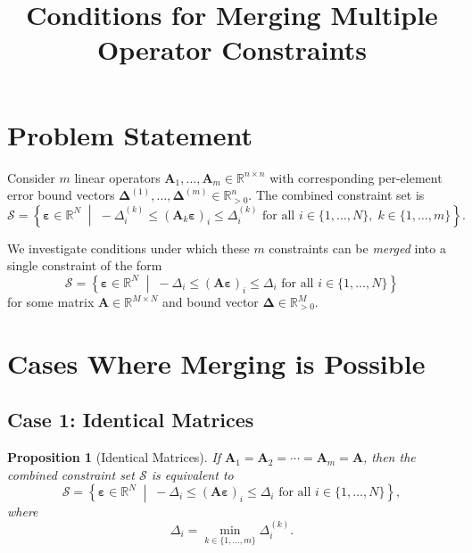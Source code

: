 \documentclass{article}
\title{Conditions for Merging Multiple Operator Constraints}
\author{}
\date{}
\newtheorem{proposition}{Proposition}
\begin{document}
\maketitle

\section{Problem Statement}

Consider $m$ linear operators $\mathbf{A}_1, \ldots, \mathbf{A}_m \in \mathbb{R}^{n \times n}$ with corresponding per-element error bound vectors $\boldsymbol{\Delta}^{(1)}, \ldots, \boldsymbol{\Delta}^{(m)} \in \mathbb{R}^n_{>0}$. The combined constraint set is
\begin{equation}
    \mathcal{S} = \left\{ \boldsymbol{\varepsilon} \in \mathbb{R}^N \;\middle|\; -\Delta_i^{(k)} \leq (\mathbf{A}_k \boldsymbol{\varepsilon})_i \leq \Delta_i^{(k)} \text{ for all } i \in \{1, \ldots, N\}, \; k \in \{1, \ldots, m\} \right\}.
\end{equation}

We investigate conditions under which these $m$ constraints can be \emph{merged} into a single constraint of the form
\begin{equation}
    \mathcal{S} = \left\{ \boldsymbol{\varepsilon} \in \mathbb{R}^N \;\middle|\; -\Delta_i \leq (\mathbf{A} \boldsymbol{\varepsilon})_i \leq \Delta_i \text{ for all } i \in \{1, \ldots, N\} \right\}
\end{equation}
for some matrix $\mathbf{A} \in \mathbb{R}^{M \times N}$ and bound vector $\boldsymbol{\Delta} \in \mathbb{R}^M_{>0}$.

\section{Cases Where Merging is Possible}

\subsection{Case 1: Identical Matrices}

\begin{proposition}[Identical Matrices]
\label{prop:identical}
If $\mathbf{A}_1 = \mathbf{A}_2 = \cdots = \mathbf{A}_m = \mathbf{A}$, then the combined constraint set $\mathcal{S}$ is equivalent to
\begin{equation}
    \mathcal{S} = \left\{ \boldsymbol{\varepsilon} \in \mathbb{R}^N \;\middle|\; -\Delta_i \leq (\mathbf{A} \boldsymbol{\varepsilon})_i \leq \Delta_i \text{ for all } i \in \{1, \ldots, N\} \right\},
\end{equation}
where
\begin{equation}
    \Delta_i = \min_{k \in \{1, \ldots, m\}} \Delta_i^{(k)}.
\end{equation}
\end{proposition}
\end{document}
